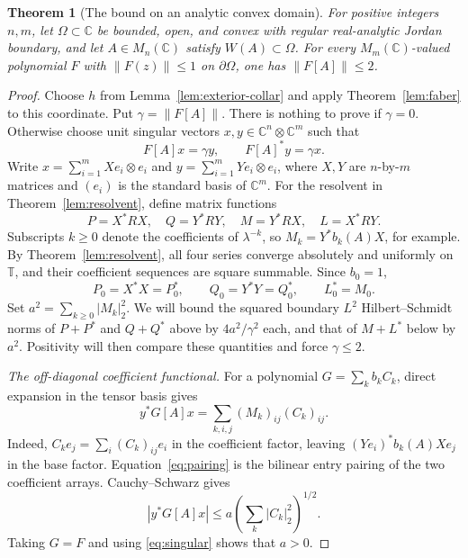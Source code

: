 \documentclass[11pt]{article}
\newcommand{\C}{\mathbb C}
\newcommand{\T}{\mathbb T}
\newcommand{\HS}[1]{\lvert #1\rvert_2}
\newtheorem{theorem}{Theorem}[section]
\theoremstyle{remark}\newtheorem{remark}[theorem]{Remark}
\numberwithin{equation}{section}
\begin{document}
\begin{theorem}[The bound on an analytic convex domain]\label{thm:domain}
For positive integers $n,m$, let $\Omega\subset\C$ be bounded, open, and convex with regular real-analytic Jordan boundary, and let $A\in M_n(\C)$ satisfy $W(A)\subset\Omega$. For every $M_m(\C)$-valued polynomial $F$ with $\|F(z)\|\le1$ on $\partial\Omega$, one has $\|F[A]\|\le2$.
\end{theorem}
\begin{proof}
Choose $h$ from Lemma~\ref{lem:exterior-collar} and apply
Theorem~\ref{lem:faber} to this coordinate.
Put $\gamma=\|F[A]\|$. There is nothing to prove if $\gamma=0$. Otherwise choose unit singular vectors $x,y\in\C^n\otimes\C^m$ such that
\begin{equation}\label{eq:singular}
 F[A]x=\gamma y,\qquad F[A]^*y=\gamma x.
\end{equation}
Write $x=\sum_{i=1}^mXe_i\otimes e_i$ and $y=\sum_{i=1}^mYe_i\otimes e_i$, where $X,Y$ are $n$-by-$m$ matrices and $(e_i)$ is the standard basis of $\C^m$. For the resolvent in Theorem~\ref{lem:resolvent}, define matrix functions
\[
 P=X^*RX,\quad Q=Y^*RY,\quad M=Y^*RX,\quad L=X^*RY.
\]
Subscripts $k\ge0$ denote the coefficients of $\lambda^{-k}$, so $M_k=Y^*b_k(A)X$, for example. By Theorem~\ref{lem:resolvent}, all four series converge absolutely and uniformly on $\T$, and their coefficient sequences are square summable. Since $b_0=1$,
\begin{equation}\label{eq:means}
 P_0=X^*X=P_0^*,\qquad Q_0=Y^*Y=Q_0^*,\qquad L_0^*=M_0.
\end{equation}
Set $a^2=\sum_{k\ge0}\HS{M_k}^2$. We will bound the squared
boundary $L^2$ Hilbert--Schmidt norms of $P+P^*$ and $Q+Q^*$
above by $4a^2/\gamma^2$ each, and that of $M+L^*$ below by $a^2$.
Positivity will then compare these quantities and force $\gamma\le2$.

\emph{The off-diagonal coefficient functional.}
For a polynomial $G=\sum_k b_kC_k$, direct expansion in the tensor basis gives
\begin{equation}\label{eq:pairing}
 y^*G[A]x=\sum_{k,i,j}(M_k)_{ij}(C_k)_{ij}.
\end{equation}
Indeed, $C_ke_j=\sum_i(C_k)_{ij}e_i$ in the coefficient factor, leaving $(Ye_i)^*b_k(A)Xe_j$ in the base factor. Equation~\eqref{eq:pairing} is the bilinear entry pairing of the two coefficient arrays. Cauchy--Schwarz gives
\begin{equation}\label{eq:crossfunctional}
 |y^*G[A]x|\le a\left(\sum_k\HS{C_k}^2\right)^{1/2}.
\end{equation}
Taking $G=F$ and using \eqref{eq:singular} shows that $a>0$.


\end{proof}
\end{document}
